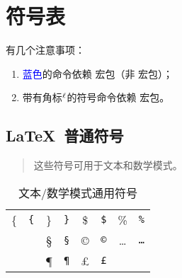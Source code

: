 \def\lsym{$\mathsurround=0pt {}^\ell$}
\def\LSYM    #1{$#1$     & \texttt{\string#1}\lsym}

\def\SYM     #1{$#1$     & \texttt{\string#1}}
\def\BIGSYM  #1{$#1$     & $\displaystyle #1$ & \texttt{\string#1}}
\def\ACC   #1#2{$#1{#2}$ & \texttt{\string#1}\marg*{#2}}
\def\DEL     #1{$\big#1 \bigg#1$ & \texttt{\string#1}}

\def\AMSSYM  #1{$#1$     & \texttt{\string#1}}
\def\AMSM    #1{$#1$     & \textcolor{blue}{\texttt{\string#1}}}
\def\AMSACC#1#2{$#1{#2}$ & \textcolor{blue}{\texttt{\string#1}}\marg*{#2}}
\def\AMSBIG  #1{$#1$     & $\displaystyle #1$ & \textcolor{blue}{\texttt{\string#1}}}

\def\SC      #1{#1       & \texttt{\string#1}}

\newenvironment{symbols}[1]%
  {\small\def\arraystretch{1.1}
  \begin{tabular}{@{}#1@{}}}%
  {\end{tabular}}

\clearpage
\section{符号表}\label{sec:math-tables}

有几个注意事项：
\begin{enumerate}
  \item \textcolor{blue}{蓝色}的命令依赖  宏包（非  宏包）；
  \item 带有角标\lsym 的符号命令依赖  宏包。
\end{enumerate}

\subsection{\LaTeX\ 普通符号}

\begin{table}[htp]
\centering
\caption{文本/数学模式通用符号}\label{tbl:general-syms}
\begin{quote}\footnotesize%
这些符号可用于文本和数学模式。
\end{quote}
\begin{symbols}{*4{cl}}
\hline
 \SC{\{}    &  \SC{\}}  &  \SC{\$}         &  \SC{\%}               \\
 \SC{\dag}  &  \SC{\S}  &  \SC{\copyright} &  \SC{\dots}            \\
 \SC{\ddag} &  \SC{\P}  &  \SC{\pounds}    &                        \\
\hline
\end{symbols}
\end{table}

